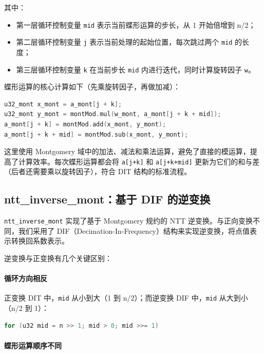 \documentclass[a4paper]{article}
\begin{document}
其中：

\begin{itemize}
  \item 第一层循环控制变量 \texttt{mid} 表示当前蝶形运算的步长，从 1 开始倍增到 n/2；
  \item 第二层循环控制变量 \texttt{j} 表示当前处理的起始位置，每次跳过两个 \texttt{mid} 的长度；
  \item 第三层循环控制变量 \texttt{k} 在当前步长 \texttt{mid} 内进行迭代，同时计算旋转因子 \texttt{w}。
\end{itemize}

蝶形运算的核心计算如下（先乘旋转因子，再做加减）：

\begin{lstlisting}[language=C++]
u32_mont x_mont = a_mont[j + k];
u32_mont y_mont = montMod.mul(w_mont, a_mont[j + k + mid]);
a_mont[j + k] = montMod.add(x_mont, y_mont);
a_mont[j + k + mid] = montMod.sub(x_mont, y_mont);
\end{lstlisting}

这里使用 Montgomery 域中的加法、减法和乘法运算，避免了直接的模运算，提高了计算效率。每次蝶形运算都会将 \texttt{a[j+k]} 和 \texttt{a[j+k+mid]} 更新为它们的和与差（后者还需要乘以旋转因子），符合 DIT 结构的标准流程。

\subsection{ntt\_inverse\_mont：基于 DIF 的逆变换}

\texttt{ntt\_inverse_mont} 实现了基于 Montgomery 规约的 NTT 逆变换。与正向变换不同，我们采用了 DIF（Decimation-In-Frequency）结构来实现逆变换，将点值表示转换回系数表示。

逆变换与正变换有几个关键区别：

\paragraph{循环方向相反}

正变换 DIT 中，\texttt{mid} 从小到大（1 到 n/2）；而逆变换 DIF 中，\texttt{mid} 从大到小（n/2 到 1）：

\begin{lstlisting}[language=C++]
for (u32 mid = n >> 1; mid > 0; mid >>= 1)
\end{lstlisting}

\paragraph{蝶形运算顺序不同}
\end{document}
